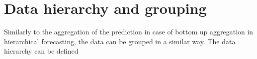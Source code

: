 

\section{Data hierarchy and grouping}
\label{sec:data_hierarchy_grouping}


Similarly to the aggregation of the prediction in case of bottom up aggregation in hierarchical forecasting, the data can be grouped in a similar way. The data hierarchy can be defined




